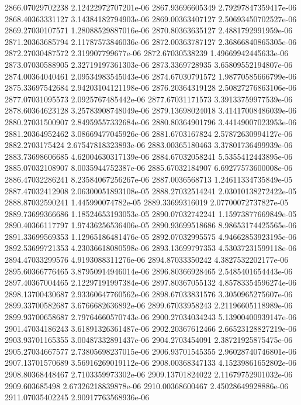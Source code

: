 {2866.07029702238 2.12422972707201e-06
2867.93696605349 2.79297847359417e-06
2868.40363331127 3.14384182794903e-06
2869.00363407127 2.50693450702527e-06
2869.27030107571 1.28088529887016e-06
2870.80363635127 2.4881792991959e-06
2871.20363685794 2.11787573846036e-06
2872.00363787127 2.36866840865305e-06
2872.27030487572 2.319907799677e-06
2872.67030538239 1.49669942445633e-06
2873.07030588905 2.32719197361303e-06
2873.3369728935 3.65809552194807e-06
2874.00364040461 2.09534983545043e-06
2874.67030791572 1.98770585666799e-06
2875.33697542684 2.94203104121198e-06
2876.20364319128 2.50827276863106e-06
2877.07031095573 2.0925767485442e-06
2877.67031171573 3.39133759977539e-06
2878.60364623128 3.25783908748049e-06
2879.13698024018 3.41417008486039e-06
2880.27031500907 2.84959557332684e-06
2880.80364901796 3.44149007023953e-06
2881.20364952462 3.08669477045926e-06
2881.6703167824 2.57872630994127e-06
2882.2703175424 2.67547818323893e-06
2883.00365180463 3.37801736499939e-06
2883.73698606685 4.62004630317139e-06
2884.67032058241 5.5355412443895e-06
2885.07032108907 8.0035944752387e-06
2885.67032184907 6.69277573600008e-06
2886.47032286241 8.23584067256267e-06
2887.0036568713 1.24611334735849e-05
2887.47032412908 2.06300051893108e-05
2888.27032514241 2.03010138272422e-05
2888.87032590241 1.445990074782e-05
2889.33699316019 2.07700072737827e-05
2889.73699366686 1.18524653193053e-05
2890.07032742241 1.15973877669849e-05
2890.40366117797 1.97436256536406e-05
2890.93699518686 8.98653174425565e-06
2891.33699569353 1.12965186481476e-05
2892.07032995575 4.94662853923195e-06
2892.53699721353 4.23036618080598e-06
2893.13699797353 4.53037231599118e-06
2894.47033299576 4.9193088311276e-06
2894.87033350242 4.3827532202177e-06
2895.60366776465 3.87950914946014e-06
2896.80366928465 2.5485401654443e-06
2897.40367004465 2.12297191997384e-06
2897.80367055132 4.85783354596274e-06
2898.13700430687 2.93360647760562e-06
2898.67033831576 3.3050965275607e-06
2899.33700582687 3.6766682636892e-06
2899.67033958243 2.21196605118989e-06
2899.93700658687 2.79764660570743e-06
2900.27034034243 5.13900400939147e-06
2901.47034186243 3.61891326361487e-06
2902.20367612466 2.66523128827219e-06
2903.93701165355 3.00487332891437e-06
2904.2703454091 2.38721925875475e-06
2905.27034667577 2.73805698237015e-06
2906.93701545355 2.96028740746801e-06
2907.13701570689 3.56916269019112e-06
2908.00368347133 4.15239861652802e-06
2908.80368448467 2.7103359973302e-06
2909.13701824022 2.11679752901032e-06
2909.603685498 2.67326218839878e-06
2910.00368600467 2.45028649928886e-06
2911.07035402245 2.90917763568936e-06
}
